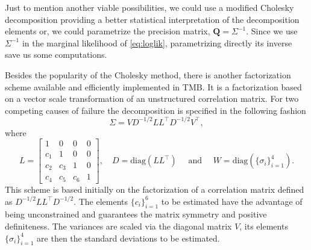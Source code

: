 Just to mention another viable possibilities, we could use a modified
Cholesky decomposition \cite{modifiedcholesky} providing a better
statistical interpretation of the decomposition elements or, we could
parametrize the precision matrix, \(\bm{Q} = \Sigma^{-1}\). Since we use
\(\Sigma^{-1}\) in the marginal likelihood of \autoref{eq:loglik},
parametrizing directly its inverse save us some computations.

Besides the popularity of the Cholesky method, there is another
factorization scheme available and efficiently implemented in TMB. It is
a factorization based on a vector scale transformation of an
unstructured correlation matrix. For two competing causes of failure the
decomposition is specified in the following fashion
\[
  \Sigma = VD^{-1/2}LL^{\top}D^{-1/2}V^{\top},
\]
where
\[
 L = \begin{bmatrix}
      1&0&0&0\\
      c_{1}&1&0&0\\
      c_{2}&c_{3}&1&0\\
      c_{4}&c_{5}&c_{6}&1
     \end{bmatrix},\quad D = \text{diag}(LL^{\top})
 \quad\text{ and }
 \quad W = \text{diag}\left(\{\sigma_{i}\}_{i=1}^{4}\right).
\]
This scheme is based initially on the factorization of a correlation
matrix defined as \(D^{-1/2}LL^{\top}D^{-1/2}\). The elements
\(\{c_{i}\}_{i=1}^{6}\) to be estimated have the advantage of being
unconstrained and guarantees the matrix symmetry and positive
definiteness. The variances are scaled via the diagonal matrix \(V\),
its elements \(\{\sigma_{i}\}_{i=1}^{4}\) are then the standard
deviations to be estimated.


